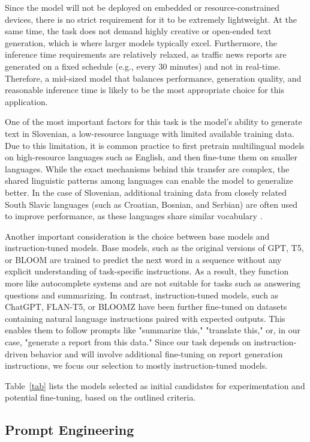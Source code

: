 \documentclass[fleqn,moreauthors,10pt]{ds_report}
\begin{document}
Since the model will not be deployed on embedded or resource-constrained devices, there is no strict requirement for it to be extremely lightweight. At the same time, the task does not demand highly creative or open-ended text generation, which is where larger models typically excel. Furthermore, the inference time requirements are relatively relaxed, as traffic news reports are generated on a fixed schedule (e.g., every 30 minutes) and not in real-time. Therefore, a mid-sized model that balances performance, generation quality, and reasonable inference time is likely to be the most appropriate choice for this application.

One of the most important factors for this task is the model's ability to generate text in Slovenian, a low-resource language with limited available training data. Due to this limitation, it is common practice to first pretrain multilingual models on high-resource languages such as English, and then fine-tune them on smaller languages. While the exact mechanisms behind this transfer are complex, the shared linguistic patterns among languages can enable the model to generalize better. In the case of Slovenian, additional training data from closely related South Slavic languages (such as Croatian, Bosnian, and Serbian) are often used to improve performance, as these languages share similar vocabulary \cite{Vres2024Generative}.

Another important consideration is the choice between base models and instruction-tuned models. Base models, such as the original versions of GPT, T5, or BLOOM are trained to predict the next word in a sequence without any explicit understanding of task-specific instructions. As a result, they function more like autocomplete systems and are not suitable for tasks such as answering questions and summarizing. In contrast, instruction-tuned models, such as ChatGPT, FLAN-T5, or BLOOMZ have been further fine-tuned on datasets containing natural language instructions paired with expected outputs. This enables them to follow prompts like "summarize this," "translate this," or, in our case, "generate a report from this data." Since our task depends on instruction-driven behavior and will involve additional fine-tuning on report generation instructions, we focus our selection to mostly instruction-tuned models.

Table~\ref{tab} lists the models selected as initial candidates for experimentation and potential fine-tuning, based on the outlined criteria.

\subsection*{Prompt Engineering}
\end{document}
